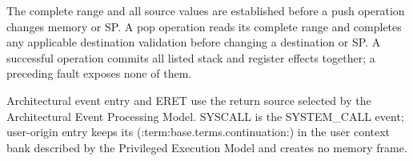 The complete range and all source values are established before a push operation changes memory or SP. A pop
operation reads its complete range and completes any applicable destination validation before changing a destination
or SP. A successful operation commits all listed stack and register effects together; a preceding fault exposes none
of them.

Architectural event entry and ERET use the return source selected by the Architectural Event Processing Model.
SYSCALL is the SYSTEM\_CALL event; user-origin entry keeps its (:term:base.terms.continuation:) in the user context bank described by
the Privileged Execution Model and creates no memory frame.
